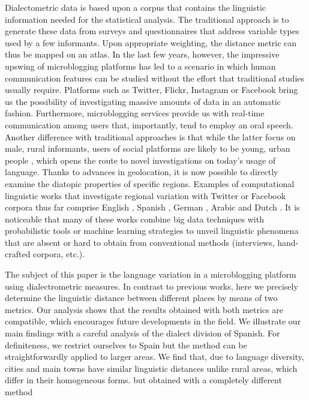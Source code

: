 \documentclass[11pt]{article}
\begin{document}
Dialectometric data is based upon a corpus that contains the linguistic information needed for the statistical
analysis. The traditional approach is to generate these data from surveys and questionnaires that
address variable types used by a few informants. Upon appropriate weighting, the distance metric can thus be mapped
on an atlas. In the last few years, however, the impressive upswing of microblogging platforms has led to a scenario in which human communication features can be studied without the effort that traditional studies usually require. Platforms such as Twitter, Flickr, Instagram or Facebook bring us the possibility of investigating massive amounts of data in an automatic fashion.
Furthermore, microblogging services provide us with real-time communication among users that, importantly,
tend to employ an oral speech.
Another difference with traditional approaches is that while the latter focus on male, rural informants, users of social platforms
are likely to be young, urban people \cite{twitterusers}, which opens the route to novel investigations on today's usage of language.
Thanks to advances in geolocation, it is now possible to directly examine
the diatopic properties of specific regions. Examples of computational linguistic works that investigate regional
variation with Twitter or Facebook corpora thus far comprise English \cite{eisenstein14-1,doyle14-1,kulkarni16-1,huang16-1,blo16}, Spanish \cite{BD,goncalves16-1,malmasi-EtAl:2016:VarDial3}, German \cite{sch14}, Arabic \cite {lin14} and Dutch \cite{tul16}.
It is noticeable that many of these works combine big data techniques with probabilistic tools or machine learning strategies
to unveil linguistic phenomena that are absent or hard to obtain from conventional methods (interviews, hand-crafted corpora, etc.).

The subject of this paper is the language variation in a microblogging platform using dialectrometric measures.
In contrast to previous works, here we precisely determine the linguistic distance between different places
by means of two metrics. Our analysis shows that the results obtained with both metrics are compatible,
which encourages future developments in the field. We illustrate our main findings with a careful analysis
of the dialect division of Spanish. For definiteness, we restrict ourselves to Spain but the method can be straightforwardly
applied to larger areas. We find that, due to language diversity, cities and main towns have similar linguistic distances
unlike rural areas, which differ in their homogeneous forms. %
but obtained with a completely different method 
\end{document}
